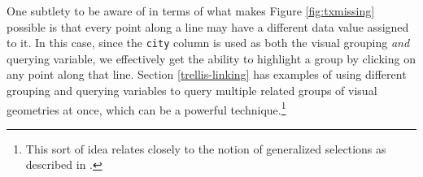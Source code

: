 \documentclass[
  12pt,
]{krantz}
\newenvironment{Shaded}{\begin{snugshade}}{\end{snugshade}}
\newcommand{\CommentTok}[1]{\textcolor[rgb]{0.56,0.35,0.01}{\textit{#1}}}
\newcommand{\DataTypeTok}[1]{\textcolor[rgb]{0.13,0.29,0.53}{#1}}
\newcommand{\KeywordTok}[1]{\textcolor[rgb]{0.13,0.29,0.53}{\textbf{#1}}}
\newcommand{\NormalTok}[1]{#1}
\newcommand{\OperatorTok}[1]{\textcolor[rgb]{0.81,0.36,0.00}{\textbf{#1}}}
\newcommand{\StringTok}[1]{\textcolor[rgb]{0.31,0.60,0.02}{#1}}
\begin{document}
One subtlety to be aware of in terms of what makes Figure \ref{fig:txmissing} possible is that every point along a line may have a different data value assigned to it. In this case, since the \texttt{city} column is used as both the visual grouping \emph{and} querying variable, we effectively get the ability to highlight a group by clicking on any point along that line. Section \ref{trellis-linking} has examples of using different grouping and querying variables to query multiple related groups of visual geometries at once, which can be a powerful technique.\footnote{This sort of idea relates closely to the notion of generalized selections as described in \citet{heer2008generalized}.}

\begin{Shaded}
\end{Shaded}
\end{document}
